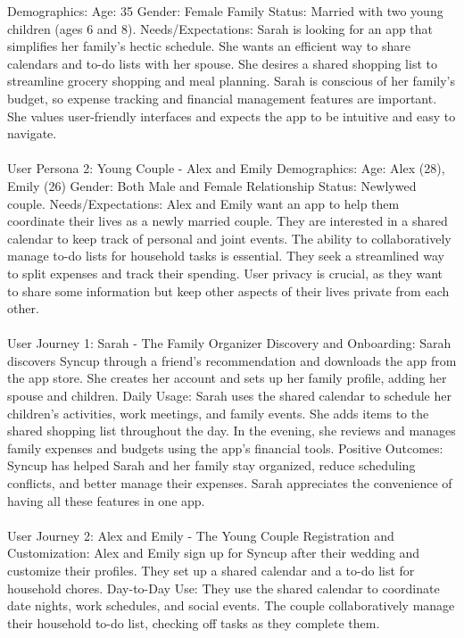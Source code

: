 \documentclass[12pt]{article}
\begin{document}
Demographics:
Age: 35
Gender: Female
Family Status: Married with two young children (ages 6 and 8).
Needs/Expectations:
Sarah is looking for an app that simplifies her family's hectic schedule. She wants an efficient way to share calendars and to-do lists with her spouse.
She desires a shared shopping list to streamline grocery shopping and meal planning.
Sarah is conscious of her family's budget, so expense tracking and financial management features are important.
She values user-friendly interfaces and expects the app to be intuitive and easy to navigate.
\\
\\
User Persona 2: Young Couple - Alex and Emily
Demographics:
Age: Alex (28), Emily (26)
Gender: Both Male and Female
Relationship Status: Newlywed couple.
Needs/Expectations:
Alex and Emily want an app to help them coordinate their lives as a newly married couple.
They are interested in a shared calendar to keep track of personal and joint events.
The ability to collaboratively manage to-do lists for household tasks is essential.
They seek a streamlined way to split expenses and track their spending.
User privacy is crucial, as they want to share some information but keep other aspects of their lives private from each other.
\\
\\
User Journey 1: Sarah - The Family Organizer
Discovery and Onboarding:
Sarah discovers Syncup through a friend's recommendation and downloads the app from the app store.
She creates her account and sets up her family profile, adding her spouse and children.
Daily Usage:
Sarah uses the shared calendar to schedule her children's activities, work meetings, and family events.
She adds items to the shared shopping list throughout the day.
In the evening, she reviews and manages family expenses and budgets using the app's financial tools.
Positive Outcomes:
Syncup has helped Sarah and her family stay organized, reduce scheduling conflicts, and better manage their expenses.
Sarah appreciates the convenience of having all these features in one app.
\\
\\
User Journey 2: Alex and Emily - The Young Couple
Registration and Customization:
Alex and Emily sign up for Syncup after their wedding and customize their profiles.
They set up a shared calendar and a to-do list for household chores.
Day-to-Day Use:
They use the shared calendar to coordinate date nights, work schedules, and social events.
The couple collaboratively manage their household to-do list, checking off tasks as they complete them.
\end{document}
